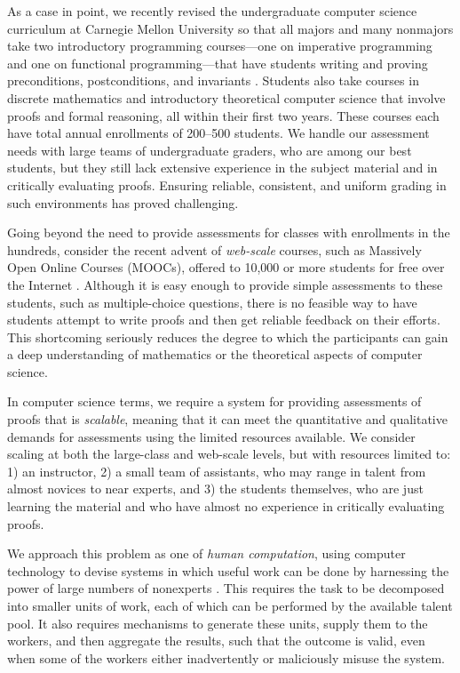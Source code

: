 \documentclass[12pt]{article}
\begin{document}
As a case in point, we recently revised the undergraduate computer science
curriculum at Carnegie Mellon University so that all majors and many
nonmajors take two introductory programming courses---one on imperative programming
and one on functional programming---that have students writing and
proving preconditions, postconditions, and invariants
\citep{bryant-ugrad10}.  Students also take courses in
discrete mathematics and introductory theoretical computer science
that involve proofs and formal reasoning, all within their first two years.
These courses each have
total annual enrollments of 200--500 students.  We handle our
assessment needs with large teams of undergraduate graders, who are
among our best students, but they still lack extensive experience in
the subject material and in critically evaluating proofs.  Ensuring
reliable, consistent, and uniform grading in such environments has proved
challenging.

Going beyond the need to provide assessments for classes with
enrollments in the hundreds, consider the recent advent of {\em web-scale}
courses, such as Massively Open Online Courses (MOOCs),
 offered to 10,000 or more students for free over the Internet
\citep{carson-am12,lewin-nyt12}.
Although it is easy enough to provide simple
assessments to these students, such as multiple-choice questions, 
there is no feasible way to have students attempt to write proofs and
then get reliable feedback on their efforts.  This shortcoming
seriously reduces the degree to which the participants can gain a deep
understanding of mathematics or the theoretical aspects of computer science.

In computer science terms, we require a system for providing
assessments of proofs that is {\em scalable}, meaning that it can meet
the quantitative and qualitative demands for assessments using the
limited resources available.  We consider scaling at both the
large-class and web-scale levels, but with 
resources limited to: 1) an instructor, 2) a small team of assistants,
who may range in talent from almost novices to near experts, and 3) the
students themselves, who are just learning the material and who have
almost no experience in critically evaluating proofs.

We approach this problem as one of {\em human computation}, using
computer technology to devise systems in which useful work can be done by
harnessing the power of large numbers of nonexperts
\citep{quinn-chi11, vonahn05}.  This requires
the task to be decomposed into smaller units of work, each of which 
can be performed by the available talent pool.  It also requires
mechanisms to generate these units, supply them to the workers, and
then aggregate the results, such that the outcome is valid, even when
some of the workers either inadvertently or maliciously misuse the system.
\end{document}
